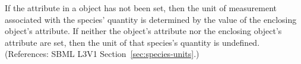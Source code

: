 If the attribute  in a \Species object has not been
set, then the unit of measurement associated with the species' quantity is
determined by the value of the enclosing \Model object's
 attribute.  If neither the \Species object's
 attribute nor the enclosing \Model object's
 attribute are set, then the unit of that species's
quantity is undefined.  (References: SBML L3V1
Section~\ref{sec:species-units}.)
